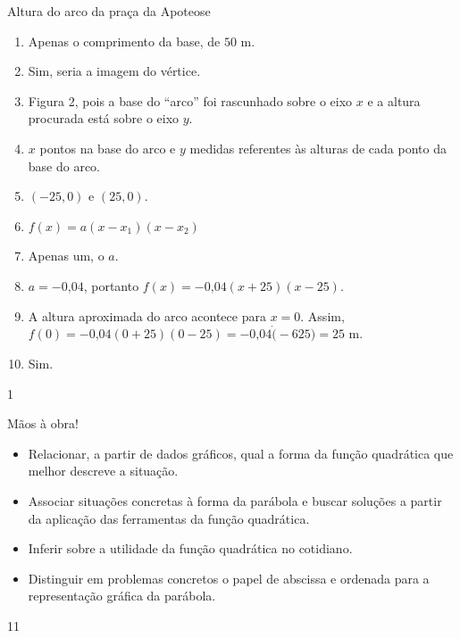 \clearmargin
\marginpar{\vspace{.5em}}
\begin{answer}{Altura do arco da praça da Apoteose}
{
\begin{enumerate}
\item {} 
Apenas o comprimento da base, de \(50\) m.

\item {} 
Sim, seria a imagem do vértice.

\item {} 
Figura 2, pois a base do “arco” foi rascunhado sobre o eixo \(x\) e a altura procurada está sobre o eixo \(y\).

\item {} 
\(x\) pontos na base do arco e \(y\) medidas referentes às alturas de cada ponto da base do arco.

\item {} 
\((-25,0)\) e \((25,0)\).

\item {} 
\(f(x)=a(x-x_1)(x-x_2)\)

\item {} 
Apenas um, o \(a\).

\item {} 
\(a=-0\text{,}04\), portanto \(f(x)=-0\text{,}04(x+25)(x-25)\).

\item {} 
A altura aproximada do arco acontece para \(x=0\). Assim, \(f(0)=-0\text{,}04(0+25)(0-25)=-0\text{,}04 \dot (-625)=25\) m.

\item {} 
Sim.

\end{enumerate}
}{1}
\end{answer}
\clearmargin
\begin{objectives}{Mãos à obra!}
{
\begin{itemize}
\item Relacionar, a partir de dados gráficos, qual a forma da função quadrática que melhor descreve a situação.

\item {} 
Associar situações concretas à forma da parábola e buscar soluções a partir da aplicação das ferramentas da função quadrática.

\item {} 
Inferir sobre a utilidade da função quadrática no cotidiano.

\item {} 
Distinguir em problemas concretos o papel de abscissa e ordenada para a representação gráfica da parábola.
\end{itemize}
}{1}{1}
\end{objectives}
